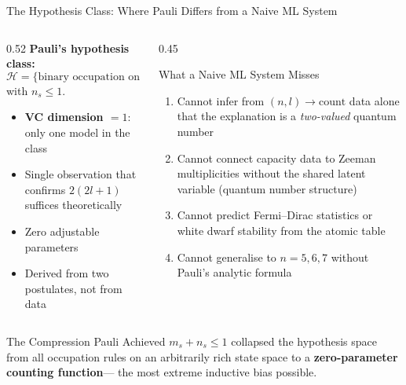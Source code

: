 \documentclass[aspectratio=169,12pt]{beamer}
\begin{document}
\begin{frame}[shrink=25]{The Hypothesis Class: Where Pauli Differs from a Naive ML System}

\begin{columns}[T]
\begin{column}{0.52\textwidth}
\textbf{Pauli's hypothesis class:}
\[
  \mathcal{H} = \bigl\{\text{binary occupation on }
  (n,l,m_l,m_s)\text{ lattice}\bigr\}
\]
with $n_s \leq 1$.

\medskip
\begin{itemize}
  \item \textbf{VC dimension $= 1$}: only one model in the class
  \item Single observation that confirms $2(2l+1)$ suffices theoretically
  \item Zero adjustable parameters
  \item Derived from two postulates, not from data
\end{itemize}
\end{column}
\begin{column}{0.45\textwidth}
\begin{alertblock}{What a Naive ML System Misses}
\begin{enumerate}
  \item Cannot infer from $(n,l) \to \text{count}$ data alone that
    the explanation is a \emph{two-valued} quantum number
  \item Cannot connect capacity data to Zeeman multiplicities without
    the shared latent variable (quantum number structure)
  \item Cannot predict Fermi--Dirac statistics or white dwarf stability
    from the atomic table
  \item Cannot generalise to $n=5,6,7$ without Pauli's analytic formula
\end{enumerate}
\end{alertblock}
\end{column}
\end{columns}

\bigskip
\begin{block}{The Compression Pauli Achieved}
$m_s + n_s\leq 1$ collapsed the hypothesis space from all occupation rules
on an arbitrarily rich state space to a \textbf{zero-parameter counting function}---
the most extreme inductive bias possible.
\end{block}

\end{frame}
\end{document}

